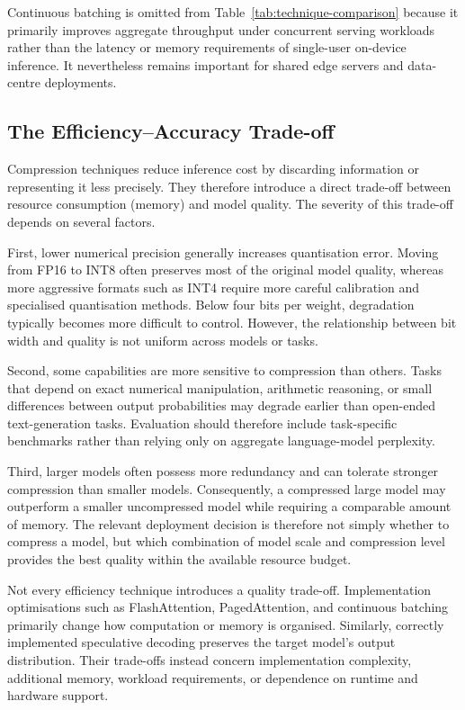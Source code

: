Continuous batching is omitted from Table~\ref{tab:technique-comparison}
because it primarily improves aggregate throughput under concurrent serving
workloads rather than the latency or memory requirements of single-user
on-device inference. It nevertheless remains important for shared edge servers
and data-centre deployments.

\subsection{The Efficiency--Accuracy Trade-off}
\label{subsec:efficiency-accuracy}

Compression techniques reduce inference cost by discarding information or 
representing it less precisely. They therefore introduce a direct trade-off 
between resource consumption (memory) and model quality. The severity of this trade-off 
depends on several factors.

First, lower numerical precision generally increases quantisation error. Moving 
from FP16 to INT8 often preserves most of the original model quality, whereas 
more aggressive formats such as INT4 require more careful calibration and 
specialised quantisation methods. Below four bits per weight, degradation 
typically becomes more difficult to control. However, the relationship between 
bit width and quality is not uniform across models or tasks.

Second, some capabilities are more sensitive to compression than others. Tasks 
that depend on exact numerical manipulation, arithmetic reasoning, or small 
differences between output probabilities may degrade earlier than open-ended 
text-generation tasks. Evaluation should therefore include task-specific 
benchmarks rather than relying only on aggregate language-model perplexity.

Third, larger models often possess more redundancy and can tolerate stronger 
compression than smaller models. Consequently, a compressed large model may 
outperform a smaller uncompressed model while requiring a comparable amount of 
memory. The relevant deployment decision is therefore not simply whether to 
compress a model, but which combination of model scale and compression level 
provides the best quality within the available resource budget.

Not every efficiency technique introduces a quality trade-off. Implementation 
optimisations such as FlashAttention, PagedAttention, and continuous batching 
primarily change how computation or memory is organised. Similarly, correctly 
implemented speculative decoding preserves the target model's output 
distribution. Their trade-offs instead concern implementation complexity, 
additional memory, workload requirements, or dependence on runtime and hardware 
support.

